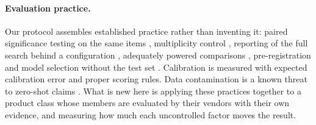 \paragraph{Evaluation practice.} Our protocol assembles established practice rather than inventing it: paired
significance testing on the same items \citep{mcnemar-1947,dietterich-1998-approximate,dror-etal-2018-hitchhikers},
multiplicity control \citep{dror-etal-2017-replicability}, reporting of the full search behind a configuration
\citep{dodge-etal-2019-show,gorman-bedrick-2019-need}, adequately powered comparisons \citep{card-etal-2020-little},
pre-registration \citep{van-miltenburg-etal-2021-preregistering} and model selection without the test set
\citep{perez-etal-2021-true-few-shot}. Calibration is measured with expected calibration error
\citep{guo-etal-2017-calibration} and proper scoring rules. Data contamination is a known threat to zero-shot claims
\citep{magar-schwartz-2022-data,sainz-etal-2023-nlp}. What is new here is applying these practices together to a
product class whose members are evaluated by their vendors with their own evidence, and measuring how much each
uncontrolled factor moves the result.

